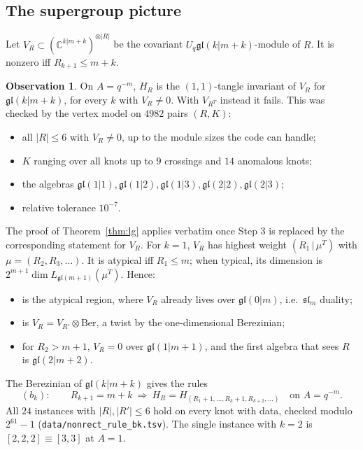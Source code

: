 \documentclass[11pt]{article}
\theoremstyle{definition}
\newtheorem{observation}[theorem]{Observation}
\theoremstyle{remark}
\newcommand{\gl}{\mathfrak{gl}}
\begin{document}
\subsection{The supergroup picture}
Let $V_R\subset(\mathbb{C}^{k|m+k})^{\otimes|R|}$ be the covariant $U_q\gl(k|m+k)$-module of $R$.  It is nonzero iff
$R_{k+1}\le m+k$.
\begin{observation}\label{obs:h1}
On $A=q^{-m}$, $H_R$ is the $(1,1)$-tangle invariant of $V_R$ for $\gl(k|m+k)$, for every $k$ with $V_R\neq0$.
With $V_{R^T}$ instead it fails.  This was checked by the vertex model on $4982$ pairs $(R,K)$:
\begin{itemize}
\item all $|R|\le6$ with $V_R\ne0$, up to the module sizes the code can handle;
\item $K$ ranging over all knots up to $9$ crossings and $14$ anomalous knots;
\item the algebras $\gl(1|1),\gl(1|2),\gl(1|3),\gl(2|2),\gl(2|3)$;
\item relative tolerance $10^{-7}$.
\end{itemize}
\end{observation}
The proof of Theorem~\ref{thm:lg} applies verbatim once Step 3 is replaced by the corresponding statement for
$V_R$.  For $k=1$, $V_R$ has highest weight $(R_1\,|\,\mu^T)$ with $\mu=(R_2,R_3,\dots)$.  It is atypical iff
$R_1\le m$; when typical, its dimension is $2^{m+1}\dim L_{\gl(m+1)}(\mu^T)$.  Hence:
\begin{itemize}
\item[(a)] is the atypical region, where $V_R$ already lives over $\gl(0|m)$, i.e.\ $\mathfrak{sl}_m$ duality;
\item[(b)] is $V_R=V_{R'}\otimes\mathrm{Ber}$, a twist by the one-dimensional Berezinian;
\item[(c)] for $R_2>m+1$, $V_R=0$ over $\gl(1|m+1)$, and the first algebra that sees $R$ is $\gl(2|m+2)$.
\end{itemize}
The Berezinian of $\gl(k|m+k)$ gives the rules
\[
  (b_k):\qquad R_{k+1}=m+k\ \Rightarrow\ H_R=H_{(R_1+1,\dots,R_k+1,R_{k+2},\dots)}\quad\text{on }A=q^{-m}.
\]
All $24$ instances with $|R|,|R'|\le6$ hold on every knot with data, checked modulo $2^{61}-1$
(\texttt{data/nonrect\_rule\_bk.tsv}).  The single instance with $k=2$ is $[2,2,2]\equiv[3,3]$ at $A=1$.
\end{document}
